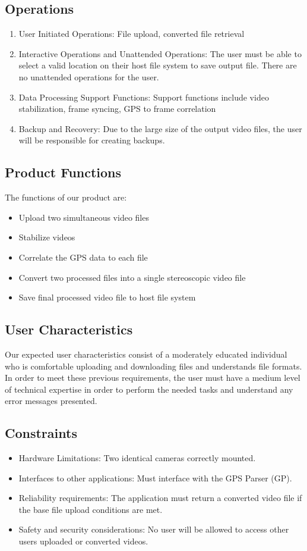 \documentclass[10pt,letterpaper,onecolumn]{article}
\begin{document}
\subsection{Operations}
\begin{enumerate}[label=\alph*)]
  \item User Initiated Operations: File upload, converted file retrieval
  \item Interactive Operations and Unattended Operations: The user must be able to select a valid location on their host file system to save output file. There are no unattended operations for the user.
  \item Data Processing Support Functions: Support functions include video stabilization, frame syncing, GPS to frame correlation
  \item Backup and Recovery: Due to the large size of the output video files, the user will be responsible for creating backups.
\end{enumerate}

\subsection{Product Functions}
The functions of our product are:
\begin{itemize}
  \item Upload two simultaneous video files
  \item Stabilize videos
  \item Correlate the GPS data to each file
  \item Convert two processed files into a single stereoscopic video file
  \item Save final processed video file to host file system
\end{itemize}

\subsection{User Characteristics}
Our expected user characteristics consist of a moderately educated individual who is comfortable uploading and downloading files and understands file formats.
In order to meet these previous requirements, the user must have a medium level of technical expertise in order to perform the needed tasks and understand any error messages presented.

\subsection{Constraints}
\begin{itemize}
  \item Hardware Limitations: Two identical cameras correctly mounted.
  \item Interfaces to other applications: Must interface with the GPS Parser (GP).
  \item Reliability requirements: The application must return a converted video file if the base file upload conditions are met.
  \item Safety and security considerations: No user will be allowed to access other users uploaded or converted videos.
\end{itemize}
\end{document}
